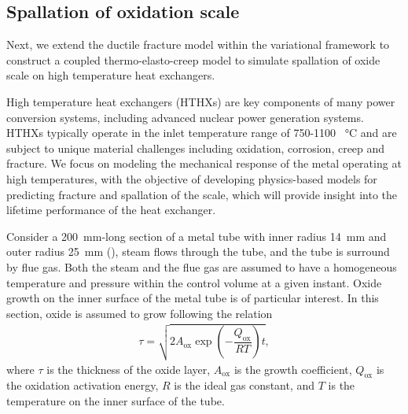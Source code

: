 \subsection{Spallation of oxidation scale}

Next, we extend the ductile fracture model within the variational framework to construct a coupled thermo-elasto-creep model to simulate spallation of oxide scale on high temperature heat exchangers.

High temperature heat exchangers (HTHXs) are key components of many power conversion systems, including advanced nuclear power generation systems. HTHXs typically operate in the inlet temperature range of 750-1100 \SI{}{\celsius} and are subject to unique material challenges including oxidation, corrosion, creep and fracture.  We focus on modeling the mechanical response of the metal operating at high temperatures, with the objective of developing physics-based models for predicting fracture and spallation of the scale, which will provide insight into the lifetime performance of the heat exchanger.



Consider a \SI{200}{\milli\meter}-long section of a metal tube with inner radius \SI{14}{\milli\meter} and outer radius \SI{25}{\milli\meter} (), steam flows through the tube, and the tube is surround by flue gas. Both the steam and the flue gas are assumed to have a homogeneous temperature and pressure within the control volume at a given instant. Oxide growth on the inner surface of the metal tube is of particular interest. In this section, oxide is assumed to grow following the relation
\begin{align}
  \tau = \sqrt{2A_\text{ox}\exp\left( -\dfrac{Q_\text{ox}}{RT} \right) t},
\end{align}
where $\tau$ is the thickness of the oxide layer, $A_\text{ox}$ is the growth coefficient, $Q_\text{ox}$ is the oxidation activation energy, $R$ is the ideal gas constant, and $T$ is the temperature on the inner surface of the tube.

